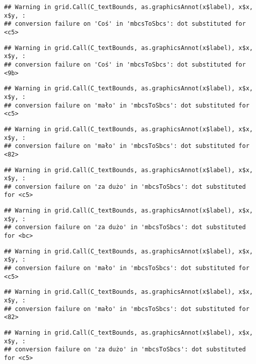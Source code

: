 \documentclass[
]{book}
\begin{document}
\begin{verbatim}
## Warning in grid.Call(C_textBounds, as.graphicsAnnot(x$label), x$x, x$y, :
## conversion failure on 'Coś' in 'mbcsToSbcs': dot substituted for <c5>
\end{verbatim}

\begin{verbatim}
## Warning in grid.Call(C_textBounds, as.graphicsAnnot(x$label), x$x, x$y, :
## conversion failure on 'Coś' in 'mbcsToSbcs': dot substituted for <9b>
\end{verbatim}

\begin{verbatim}
## Warning in grid.Call(C_textBounds, as.graphicsAnnot(x$label), x$x, x$y, :
## conversion failure on 'mało' in 'mbcsToSbcs': dot substituted for <c5>
\end{verbatim}

\begin{verbatim}
## Warning in grid.Call(C_textBounds, as.graphicsAnnot(x$label), x$x, x$y, :
## conversion failure on 'mało' in 'mbcsToSbcs': dot substituted for <82>
\end{verbatim}

\begin{verbatim}
## Warning in grid.Call(C_textBounds, as.graphicsAnnot(x$label), x$x, x$y, :
## conversion failure on 'za dużo' in 'mbcsToSbcs': dot substituted for <c5>
\end{verbatim}

\begin{verbatim}
## Warning in grid.Call(C_textBounds, as.graphicsAnnot(x$label), x$x, x$y, :
## conversion failure on 'za dużo' in 'mbcsToSbcs': dot substituted for <bc>
\end{verbatim}

\begin{verbatim}
## Warning in grid.Call(C_textBounds, as.graphicsAnnot(x$label), x$x, x$y, :
## conversion failure on 'mało' in 'mbcsToSbcs': dot substituted for <c5>
\end{verbatim}

\begin{verbatim}
## Warning in grid.Call(C_textBounds, as.graphicsAnnot(x$label), x$x, x$y, :
## conversion failure on 'mało' in 'mbcsToSbcs': dot substituted for <82>
\end{verbatim}

\begin{verbatim}
## Warning in grid.Call(C_textBounds, as.graphicsAnnot(x$label), x$x, x$y, :
## conversion failure on 'za dużo' in 'mbcsToSbcs': dot substituted for <c5>
\end{verbatim}
\end{document}
